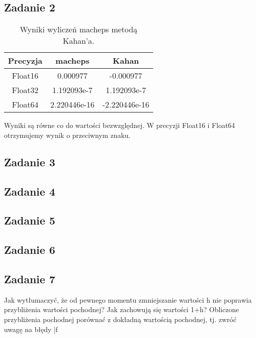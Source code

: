 \documentclass[]{article}
\begin{document}
\subsection{Zadanie 2}
\begin{table}[h!]
	\centering
	\begin{tabular}{||c c c||} 
		\hline
		Precyzja & macheps & Kahan \\ [0.5ex] 
		\hline\hline
		Float16 & 0.000977 &  -0.000977\\ 
		Float32 & 1.192093e-7 & 1.192093e-7\\
		Float64 & 2.220446e-16 & -2.220446e-16 \\
		\hline
	\end{tabular}
	\caption{Wyniki wyliczeń macheps metodą Kahan'a.}
\end{table}
Wyniki są równe co do wartości bezwzględnej. W precyzji Float16 i Float64 otrzymujemy wynik o przeciwnym znaku.
\subsection{Zadanie 3}
\subsection{Zadanie 4}
\subsection{Zadanie 5}
\subsection{Zadanie 6}
\subsection{Zadanie 7}
Jak wytłumaczyć, że od pewnego momentu zmniejszanie wartości h nie poprawia przybliżenia wartości pochodnej? Jak zachowują się wartości 1+h? Obliczone przybliżenia pochodnej
porównać z dokładną wartością pochodnej, tj. zwróć uwagę na błędy |f
\end{document}
